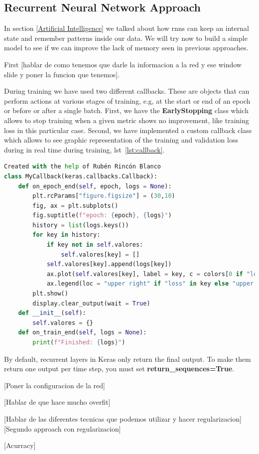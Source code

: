 \subsection{Recurrent Neural Network Approach}

In section \ref{Artificial Intelligence} we talked about how \glspl{rnn} can keep an internal state and remember patterns inside our data. We will try now to build a simple model to see if we can improve the lack of memory seen in previous approaches.

First [hablar de como tenemos que darle la informacion a la red y ese window slide y poner la funcion que tenemos].

During training we have used two different callbacks. These are objects that can perform actions at various stages of training, e.g, at the start or end of an epoch or before or after a single batch. First, we have the \textbf{EarlyStopping} class which allows to stop training when a given metric shows no improvement, like training loss in this particular case. Second, we have implemented a custom callback class which allows to see graphic representation of the training and validation loss during in real time during training, lst~\ref{lst:callback}.

\begin{lstlisting}[language=python,caption=Custom Keras Callback,label={lst:callback}]
Created with the help of Rubén Rincón Blanco
class MyCallback(keras.callbacks.Callback):
    def on_epoch_end(self, epoch, logs = None):
        plt.rcParams["figure.figsize"] = (30,10)
        fig, ax = plt.subplots()
        fig.suptitle(f"epoch: {epoch}, {logs}")
        history = list(logs.keys())
        for key in history:
            if key not in self.valores:
                self.valores[key] = []
            self.valores[key].append(logs[key])
            ax.plot(self.valores[key], label = key, c = colors[0 if "loss" in key else 1], linestyle='--' if 'val' in key else '-')
            ax.legend(loc = "upper right" if "loss" in key else "upper left")
        plt.show()
        display.clear_output(wait = True)
    def __init__(self):
        self.valores = {}
    def on_train_end(self, logs = None):
        print(f"Finished: {logs}")
\end{lstlisting}

By default, recurrent layers in Keras only return the final output. To make them return one output per time step, you must set \textbf{return\_sequences=True}.

[Poner la configuracion de la red]

[Hablar de que hace mucho overfit]

[Hablar de las diferentes tecnicas que podemos utilizar y hacer regularizacion]
[Segundo approach con regularizacion]



[Acurracy]

